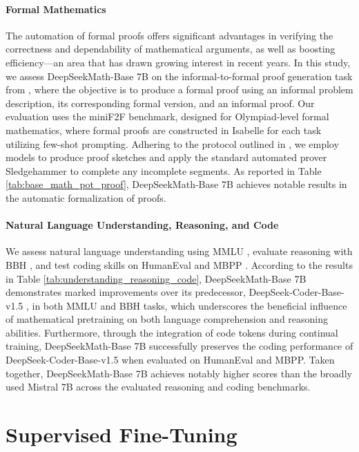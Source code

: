 \begin{itemize}[topsep=0pt]
\paragraph{Formal Mathematics}

The automation of formal proofs offers significant advantages in verifying the correctness and dependability of mathematical arguments, as well as boosting efficiency—an area that has drawn growing interest in recent years. In this study, we assess DeepSeekMath-Base 7B on the informal-to-formal proof generation task from \citep{dsp_proof}, where the objective is to produce a formal proof using an informal problem description, its corresponding formal version, and an informal proof. Our evaluation uses the miniF2F \citep{minif2f} benchmark, designed for Olympiad-level formal mathematics, where formal proofs are constructed in Isabelle for each task utilizing few-shot prompting. Adhering to the protocol outlined in \cite{dsp_proof}, we employ models to produce proof sketches and apply the standard automated prover Sledgehammer \citep{sledgehammer} to complete any incomplete segments. As reported in Table \ref{tab:base_math_pot_proof}, DeepSeekMath-Base 7B achieves notable results in the automatic formalization of proofs.

\paragraph{Natural Language Understanding, Reasoning, and Code}

We assess natural language understanding using MMLU \citep{mmlu}, evaluate reasoning with BBH \citep{bbh}, and test coding skills on HumanEval \citep{codex} and MBPP \citep{mbpp}. According to the results in Table \ref{tab:understanding_reasoning_code}, DeepSeekMath-Base 7B demonstrates marked improvements over its predecessor, DeepSeek-Coder-Base-v1.5 \citep{deepseek-coder}, in both MMLU and BBH tasks, which underscores the beneficial influence of mathematical pretraining on both language comprehension and reasoning abilities. Furthermore, through the integration of code tokens during continual training, DeepSeekMath-Base 7B successfully preserves the coding performance of DeepSeek-Coder-Base-v1.5 when evaluated on HumanEval and MBPP. Taken together, DeepSeekMath-Base 7B achieves notably higher scores than the broadly used Mistral 7B \citep{mistral} across the evaluated reasoning and coding benchmarks.

\section{Supervised Fine-Tuning}


\end{itemize}
